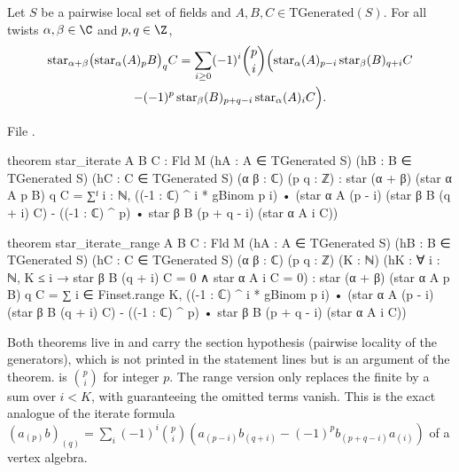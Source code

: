 \begin{theorem}\label{ch08:thm:assoc}
Let $S$ be a pairwise local set of fields and $A,B,C\in\mathrm{TGenerated}(S)$.  For all twists
$\alpha,\beta\in\C$ and $p,q\in\Z$,
\begin{multline*}
  \mathrm{star}_{\alpha+\beta}\bigl(\mathrm{star}_\alpha(A)_pB\bigr)_qC
  =\sum_{i\ge0}(-1)^i\binom pi\Bigl(\mathrm{star}_\alpha(A)_{p-i}\,\mathrm{star}_\beta(B)_{q+i}C\\
  -(-1)^p\,\mathrm{star}_\beta(B)_{p+q-i}\,\mathrm{star}_\alpha(A)_iC\Bigr).
\end{multline*}
\end{theorem}
\noindent File .
\begin{leancode}
theorem star_iterate {A B C : Fld M} (hA : A ∈ TGenerated S) (hB : B ∈ TGenerated S)
    (hC : C ∈ TGenerated S) (α β : ℂ) (p q : ℤ) :
    star (α + β) (star α A p B) q C
      = ∑ᶠ i : ℕ, ((-1 : ℂ) ^ i * gBinom p i) •
          (star α A (p - i) (star β B (q + i) C)
            - ((-1 : ℂ) ^ p) • star β B (p + q - i) (star α A i C))

theorem star_iterate_range {A B C : Fld M} (hA : A ∈ TGenerated S) (hB : B ∈ TGenerated S)
    (hC : C ∈ TGenerated S) (α β : ℂ) (p q : ℤ) (K : ℕ)
    (hK : ∀ i : ℕ, K ≤ i → star β B (q + i) C = 0 ∧ star α A i C = 0) :
    star (α + β) (star α A p B) q C
      = ∑ i ∈ Finset.range K, ((-1 : ℂ) ^ i * gBinom p i) •
          (star α A (p - i) (star β B (q + i) C)
            - ((-1 : ℂ) ^ p) • star β B (p + q - i) (star α A i C))
\end{leancode}
\begin{dictionary}
Both theorems live in  and carry the section hypothesis
 (pairwise locality of the generators), which is
not printed in the statement lines but is an argument of the theorem.   is
$\binom pi$ for integer $p$.  The range version only replaces the finite  by a sum
over $i<K$, with  guaranteeing the omitted terms vanish.  This is the exact analogue of
the iterate formula $(a_{(p)}b)_{(q)}=\sum_i(-1)^i\binom pi(a_{(p-i)}b_{(q+i)}-(-1)^pb_{(p+q-i)}a_{(i)})$
of a vertex algebra.
\end{dictionary}

